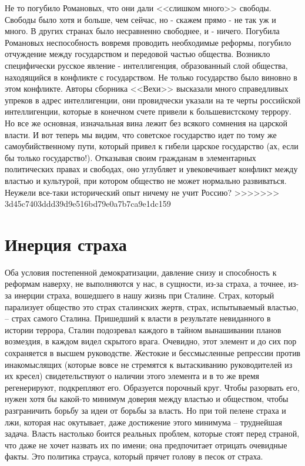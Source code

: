 \documentclass{book}
\begin{document}
Не то погубило Романовых, что они дали <<слишком много>> свободы. Свободы было хотя и больше, чем сейчас, но - ска­жем прямо - не так уж и много. В других странах было не­сравненно свободнее, и - ничего. Погубила Романовых неспо­собность вовремя  проводить необходимые реформы, погуби­ло отчуждение между государством и передовой частью обще­ства. Возникло специфически русское явление - интеллиген­ция, образованный слой общества, находящийся в конфликте с государством. Не только государство было виновно в этом конфликте. Авторы сборника <<Вехи>> высказали много спра­ведливых упреков в адрес интеллигенции, они провидчески указали на те черты российской интеллигенции, которые в ко­нечном счете привели к большевистскому террору. Но все же основная, изначальная вина лежит без всякого сомнения на царской власти. И вот теперь мы видим, что советское государство идет по тому же самоубийственному пути, который привел к гибели царское государство (ах, если бы только государство!). Отказывая своим гражданам в элементарных 
политических правах и свободах, оно углубляет и увековечивает конфликт между властью и культурой, при котором общество не может нормально развиваться. Неужели все-таки исторический опыт ничему не учит Россию?
>>>>>>> 3d45c7403ddd39d9e516bd79e0a7b7ca9e1dc159



\section{Инерция страха}

Оба условия постепенной демократизации, давление снизу и способность к реформам наверху, не выполняются у нас, в сущности, из-за страха, а точнее, из-за инерции страха,  вошедшего в нашу жизнь при Сталине. Страх, который парализует общество это страх сталинских жертв, страх, испытываемый властью, -- страх самого Сталина. Пришедший к власти в результате невиданного в истории террора, Сталин подозревал каждого в тайном вынашивании планов возмездия, в каждом видел скрытого врага. Очевидно, этот элемент и до сих пор сохраняется в высшем руководстве. Жестокие и бессмысленные репрессии против инакомыслящих (которые вовсе не стремятся к вытаскиванию руководителей из их кресел) свидетельствуют о наличии этого элемента и в то же время регенерируют, подкрепляют его. Образуется порочный круг. Чтобы разорвать его, нужен хотя бы какой-то минимум доверия между властью и обществом, чтобы разграничить борьбу за идеи от борьбы за власть. Но при той пелене страха и лжи, которая нас окутывает, даже достижение этого минимума -- 
труднейшая задача. Власть настолько боится реальных проблем, которые стоят перед страной, что даже не хочет назвать их по имени; она предпочитает отрицать очевидные факты. Это политика страуса, который прячет голову в песок от страха.
\end{document}
